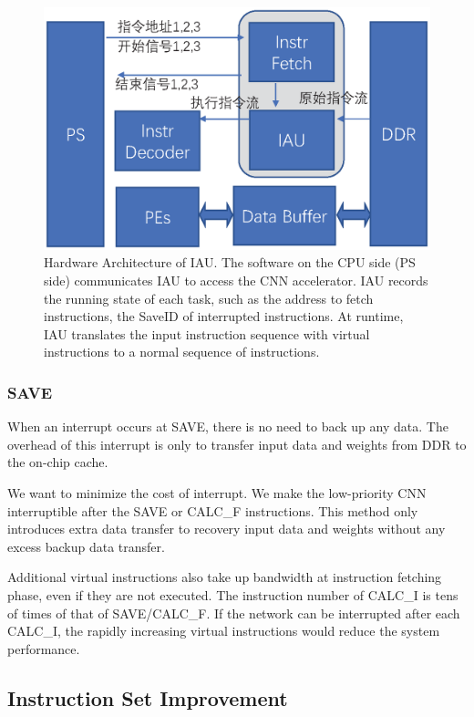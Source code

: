 \begin{figure}[t]
	\centering
	\includegraphics[width=0.99\linewidth]{fig/iau.eps}
	\caption{Hardware Architecture of IAU. The software on the CPU side (PS side) communicates IAU to access the CNN accelerator. IAU records the running state of each task, such as the address to fetch instructions, the SaveID of interrupted instructions. At runtime, IAU translates the input instruction sequence with virtual instructions to a normal sequence of instructions. }
	\label{fig:IAU}
\end{figure}

\subsubsection{SAVE}
When an interrupt occurs at SAVE, there is no need to back up any data. The overhead of this interrupt is only to transfer input data and weights from DDR to the on-chip cache.

We want to minimize the cost of interrupt. We make the low-priority CNN interruptible after the SAVE or CALC\_F instructions. This method only introduces extra data transfer to recovery input data and weights without any excess backup data transfer.

Additional virtual instructions also take up bandwidth at instruction fetching phase, even if they are not executed. The instruction number of CALC\_I is tens of times of that of SAVE/CALC\_F. If the network can be interrupted after each CALC\_I, the rapidly increasing virtual instructions would reduce the system performance.

\subsection{ Instruction Set Improvement }
\label{sec:virtualinstr}

